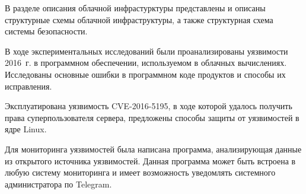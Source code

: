 В разделе описания облачной инфрастурктуры представлены и описаны структурные схемы облачной инфраструктуры, а также структурная схема системы безопасности.

В ходе экспериментальных исследований были проанализированы уязвимости 2016~г. в программном обеспечении, используемом в облачных вычислениях.
Исследованы основные ошибки в программном коде продуктов и способы их исправления.

Эксплуатирована уязвимость CVE-2016-5195, в ходе которой удалось получить права суперпользователя сервера, предложены способы защиты от уязвимостей в ядре Linux.

Для мониторинга уязвимостей была написана программа, анализирующая данные из открытого источника уязвимостей.
Данная программа может быть встроена в любую систему мониторинга и имеет возможность уведомлять системного администратора по Telegram.

\clearpage
